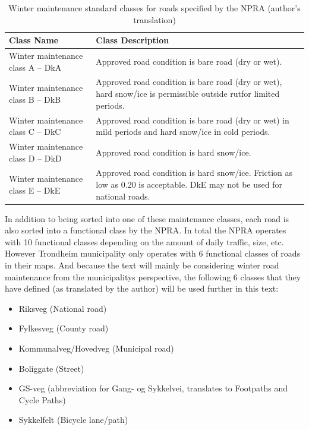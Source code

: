 \begin{table}[tbph]
\centering
\begin{tabular}{p{}p{}}
\hline
\textbf{Class Name}                 &  \textbf{Class Description}                                                                                    \\ \hline
Winter maintenance class A -- DkA  &  Approved road condition is bare road (dry or wet).                                                                                  \\
Winter maintenance class B -- DkB  &  Approved road condition is bare road (dry or wet), hard snow/ice is permissible outside rut\footnotemark for limited periods.                    \\
Winter maintenance class C -- DkC  &  Approved road condition is bare road (dry or wet) in mild periods and hard snow/ice in cold periods.                                \\
Winter maintenance class D -- DkD  &  Approved road condition is hard snow/ice.                                                                                           \\
Winter maintenance class E -- DkE  &  Approved road condition is hard snow/ice. Friction as low as 0.20 is acceptable. DkE may not be used for national roads.  \\ \hline
\end{tabular}
\caption{Winter maintenance standard classes for roads specified by the NPRA (author's translation)}
\label{tab:wmscfrsbtn}
\end{table}

In addition to being sorted into one of these maintenance classes, each road is also sorted into a functional class by the NPRA. In total the NPRA operates with 10 functional classes depending on the amount of daily traffic, size, etc. However Trondheim municipality only operates with 6 functional classes of roads in their maps. And because the text will mainly be considering winter road maintenance from the municipalitys perspective, the following 6 classes that they have defined (as translated by the author) will be used further in this text:

\begin{itemize}
    \item Riksveg (National road)
    \item Fylkesveg (County road)
    \item Kommunalveg/Hovedveg (Municipal road)
    \item Boliggate (Street)
    \item GS-veg (abbreviation for Gang- og Sykkelvei, translates to Footpaths and Cycle Paths) %
    \item Sykkelfelt (Bicycle lane/path)
\end{itemize}

